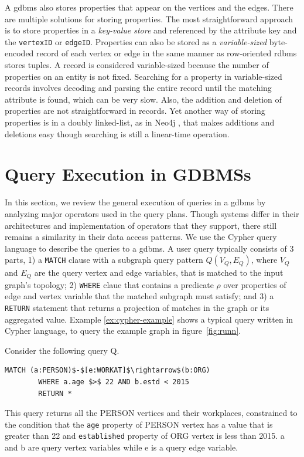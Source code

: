 A \gls{gdbms} also stores properties that appear on the vertices and the edges. There are multiple solutions for storing properties. The most straightforward approach is to store properties in a \emph{key-value store} \cite{dgraph} and referenced by the attribute key and the \texttt{vertexID} or \texttt{edgeID}. Properties can also be stored as a \emph{variable-sized} byte-encoded record of each vertex or edge in the same manner as row-oriented \gls{rdbms} stores tuples. A record is considered variable-sized because the number of properties on an entity is not fixed. Searching for a property in variable-sized records involves decoding and parsing the entire record until the matching attribute is found, which can be very slow. Also, the addition and deletion of properties are not straightforward in records. Yet another way of storing properties is in a doubly linked-list, as in Neo4j \cite{neo4j}, that makes additions and deletions easy though searching is still a linear-time operation.

\section{Query Execution in GDBMSs}
\label{sec:operators}

In this section, we review the general execution of queries in a \gls{gdbms} by analyzing major operators used in the query plans. Though systems differ in their architectures and implementation of operators that they support, there still remains a similarity in their data access patterns. We use the Cypher query language \cite{cypher} to describe the queries to a \gls{gdbms}. A user query typically consists of 3 parts, 1) a \texttt{MATCH} clause with a subgraph query pattern $Q(V_Q, E_Q)$, where $V_Q$ and $E_Q$ are the query vertex and edge variables, that is matched to the input graph's topology; 2) \texttt{WHERE} claue that contains a predicate $\rho$ over properties of edge and vertex variable that the matched subgraph must satisfy; and 3) a \texttt{RETURN} statement that returns a projection of matches in the graph or its aggregated value. Example \ref{ex:cypher-example} shows a typical query written in Cypher language, to query the example graph in figure~\ref{fig:runn}.

\begin{example}
	\label{ex:cypher-example}
	Consider the following query Q. 
	{\em 
		\begin{lstlisting}[numbers=none,  showstringspaces=false,belowskip=0pt ]
		MATCH (a:PERSON)$-$[e:WORKAT]$\rightarrow$(b:ORG)
		WHERE a.age $>$ 22 AND b.estd < 2015
		RETURN *\end{lstlisting}
	}
	This query returns all the PERSON vertices and their workplaces, constrained to the condition that the \textsc{}\texttt{age}\textsc{} property of PERSON vertex has a value that is greater than 22 and \textsc{}\texttt{established}\textsc{} property of ORG vertex is less than 2015. a and b are query vertex variables while e is a query edge variable.
\end{example}
\vspace{-5pt}

